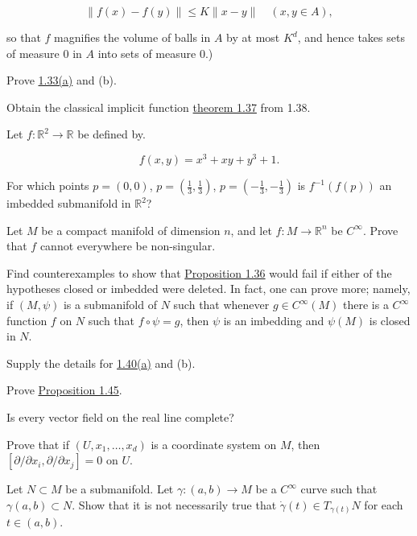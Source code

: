\begin{problemset}
	\[
		\|f(x)-f(y)\|\leq K\|x-y\|\quad(x,y\in A),
	\]

	so that $f$ magnifies the volume of balls in $A$ by at most $K^{d}$, and hence takes sets of measure 0 in $A$ into sets of measure 0.)

	\item Prove \hyperref[thm:1.33]{1.33(a)} and (b).

	\item Obtain the classical implicit function \hyperref[thm:1.37]{theorem 1.37} from 1.38.

	\item Let  $ f\colon \mathbb{R}^2 \to \mathbb{R} $ be defined by.

	\[
		f(x,y)=x^{3}+x y+y^{3}+1.
	\]

	For which points $p = (0,0)$, $p = (\tfrac{1}{3},\tfrac{1}{3})$, $p = (-\tfrac{1}{3},-\tfrac{1}{3})$ is $f^{-1}(f(p))$ an imbedded submanifold in $\mathbb{R}^2$?

	\item Let $M$ be a compact manifold of dimension $n$, and let $f: M \to \mathbb{R}^n$ be $C^\infty$. Prove that $f$ cannot everywhere be non-singular.

	\item Find counterexamples to show that \hyperref[thm:1.36]{Proposition 1.36} would fail if either of the hypotheses closed or imbedded were deleted. In fact, one can prove more; namely, if $(M,\psi)$ is a submanifold of $N$ such that whenever $g\in C^\infty(M)$ there is a $C^\infty$ function $f$ on $N$ such that $f\circ\psi=g$, then $\psi$ is an imbedding and $\psi(M)$ is closed in $N$.

	\item Supply the details for \hyperref[thm:1.40]{1.40(a)} and (b).

	\item Prove \hyperref[thm:1.45]{Proposition 1.45}.

	\item Is every vector field on the real line complete?

	\item Prove that if $(U, x_1, \ldots, x_d)$ is a coordinate system on $M$, then $[\partial/\partial x_i, \partial/\partial x_j] = 0$ on $U$.

	\item Let $N \subset M$ be a submanifold. Let $\gamma: (a,b) \to M$ be a $C^\infty$ curve such that $\gamma(a,b) \subset N$. Show that it is not necessarily true that $\dot{\gamma}(t) \in T_{\gamma(t)} N$ for each $t \in (a,b)$.


\end{problemset}

